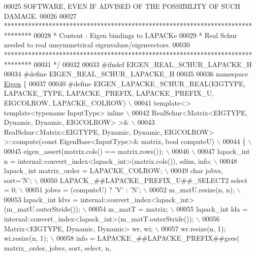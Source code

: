 \begin{DoxyCode}
00025 \textcolor{comment}{ SOFTWARE, EVEN IF ADVISED OF THE POSSIBILITY OF SUCH DAMAGE.}
00026 \textcolor{comment}{}
00027 \textcolor{comment}{ ********************************************************************************}
00028 \textcolor{comment}{ *   Content : Eigen bindings to LAPACKe}
00029 \textcolor{comment}{ *    Real Schur needed to real unsymmetrical eigenvalues/eigenvectors.}
00030 \textcolor{comment}{ ********************************************************************************}
00031 \textcolor{comment}{*/}
00032 
00033 \textcolor{preprocessor}{#ifndef EIGEN\_REAL\_SCHUR\_LAPACKE\_H}
00034 \textcolor{preprocessor}{#define EIGEN\_REAL\_SCHUR\_LAPACKE\_H}
00035 
00036 \textcolor{keyword}{namespace }\hyperlink{namespace_eigen}{Eigen} \{ 
00037 
00040 \textcolor{preprocessor}{#define EIGEN\_LAPACKE\_SCHUR\_REAL(EIGTYPE, LAPACKE\_TYPE, LAPACKE\_PREFIX, LAPACKE\_PREFIX\_U, EIGCOLROW,
       LAPACKE\_COLROW) \(\backslash\)}
00041 \textcolor{preprocessor}{template<> template<typename InputType> inline \(\backslash\)}
00042 \textcolor{preprocessor}{RealSchur<Matrix<EIGTYPE, Dynamic, Dynamic, EIGCOLROW> >& \(\backslash\)}
00043 \textcolor{preprocessor}{RealSchur<Matrix<EIGTYPE, Dynamic, Dynamic, EIGCOLROW> >::compute(const EigenBase<InputType>& matrix, bool
       computeU) \(\backslash\)}
00044 \textcolor{preprocessor}{\{ \(\backslash\)}
00045 \textcolor{preprocessor}{  eigen\_assert(matrix.cols() == matrix.rows()); \(\backslash\)}
00046 \textcolor{preprocessor}{\(\backslash\)}
00047 \textcolor{preprocessor}{  lapack\_int n = internal::convert\_index<lapack\_int>(matrix.cols()), sdim, info; \(\backslash\)}
00048 \textcolor{preprocessor}{  lapack\_int matrix\_order = LAPACKE\_COLROW; \(\backslash\)}
00049 \textcolor{preprocessor}{  char jobvs, sort='N'; \(\backslash\)}
00050 \textcolor{preprocessor}{  LAPACK\_##LAPACKE\_PREFIX\_U##\_SELECT2 select = 0; \(\backslash\)}
00051 \textcolor{preprocessor}{  jobvs = (computeU) ? 'V' : 'N'; \(\backslash\)}
00052 \textcolor{preprocessor}{  m\_matU.resize(n, n); \(\backslash\)}
00053 \textcolor{preprocessor}{  lapack\_int ldvs  = internal::convert\_index<lapack\_int>(m\_matU.outerStride()); \(\backslash\)}
00054 \textcolor{preprocessor}{  m\_matT = matrix; \(\backslash\)}
00055 \textcolor{preprocessor}{  lapack\_int lda = internal::convert\_index<lapack\_int>(m\_matT.outerStride()); \(\backslash\)}
00056 \textcolor{preprocessor}{  Matrix<EIGTYPE, Dynamic, Dynamic> wr, wi; \(\backslash\)}
00057 \textcolor{preprocessor}{  wr.resize(n, 1); wi.resize(n, 1); \(\backslash\)}
00058 \textcolor{preprocessor}{  info = LAPACKE\_##LAPACKE\_PREFIX##gees( matrix\_order, jobvs, sort, select, n,
}
\end{DoxyCode}

